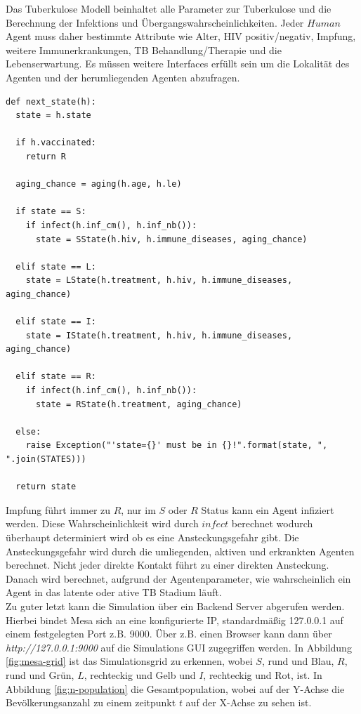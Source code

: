 \documentclass[paper=a4, fontsize=11pt, ngerman, abstract=on]{scrartcl}
\numberwithin{equation}{section} %
\numberwithin{figure}{section} %
\numberwithin{table}{section} %
\begin{document}
Das Tuberkulose Modell beinhaltet alle Parameter zur Tuberkulose und die Berechnung der Infektions und Übergangswahrscheinlichkeiten. Jeder $Human$ Agent muss daher bestimmte Attribute wie Alter, HIV positiv/negativ, Impfung, weitere Immunerkrankungen, TB Behandlung/Therapie und die Lebenserwartung. Es müssen weitere Interfaces erfüllt sein um die Lokalität des Agenten und der herumliegenden Agenten abzufragen.

\begin{lstlisting}[style=python]
def next_state(h):
  state = h.state

  if h.vaccinated:
    return R

  aging_chance = aging(h.age, h.le)

  if state == S:
    if infect(h.inf_cm(), h.inf_nb()):
      state = SState(h.hiv, h.immune_diseases, aging_chance)

  elif state == L:
    state = LState(h.treatment, h.hiv, h.immune_diseases, aging_chance)

  elif state == I:
    state = IState(h.treatment, h.hiv, h.immune_diseases, aging_chance)

  elif state == R:
    if infect(h.inf_cm(), h.inf_nb()):
      state = RState(h.treatment, aging_chance)

  else:
    raise Exception("'state={}' must be in {}!".format(state, ", ".join(STATES)))

  return state
\end{lstlisting}

Impfung führt immer zu $R$, nur im $S$ oder $R$ Status kann ein Agent infiziert werden. Diese Wahrscheinlichkeit wird durch $infect$ berechnet wodurch überhaupt determiniert wird ob es eine Ansteckungsgefahr gibt. Die Ansteckungsgefahr wird durch die umliegenden, aktiven und erkrankten Agenten berechnet. Nicht jeder direkte Kontakt führt zu einer direkten Ansteckung. Danach wird berechnet, aufgrund der Agentenparameter, wie wahrscheinlich ein Agent in das latente oder ative TB Stadium läuft. \\

Zu guter letzt kann die Simulation über ein Backend Server abgerufen werden. Hierbei bindet Mesa sich an eine konfigurierte IP, standardmäßig 127.0.0.1 auf einem festgelegten Port z.B. 9000. Über z.B. einen Browser kann dann über \textit{http://127.0.0.1:9000} auf die Simulations GUI zugegriffen werden. In Abbildung \ref{fig:mesa-grid} ist das Simulationsgrid zu erkennen, wobei $S$, rund und Blau, $R$, rund und Grün, $L$, rechteckig und Gelb und $I$, rechteckig und Rot, ist. In Abbildung \ref{fig:n-population} die Gesamtpopulation, wobei auf der Y-Achse die Bevölkerungsanzahl zu einem zeitpunkt $t$ auf der X-Achse zu sehen ist.
\end{document}

